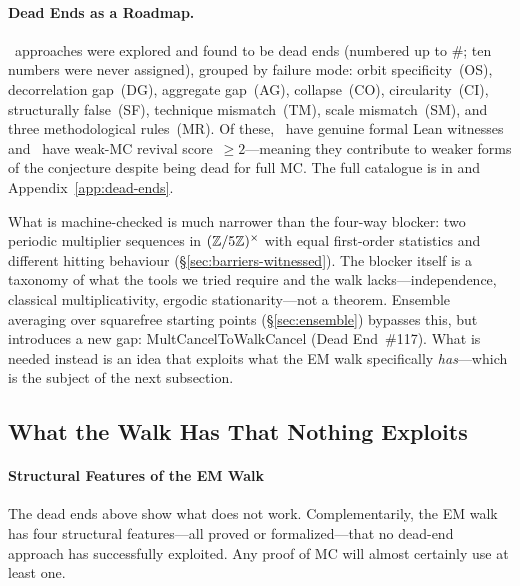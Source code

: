 \paragraph{Dead Ends as a Roadmap.}
\DEentries~approaches were explored and found to be dead ends
(numbered up to \#\DEnumbers; ten numbers were never assigned), grouped
by failure mode: orbit specificity~(OS), decorrelation gap~(DG),
aggregate gap~(AG), collapse~(CO), circularity~(CI), structurally
false~(SF), technique mismatch~(TM), scale mismatch~(SM), and three
methodological rules~(MR).  Of these, \DEwitnessed~have genuine formal
Lean witnesses and \DErevivable~have weak-MC revival score~$\geq
2$---meaning they contribute to weaker forms of the conjecture despite
being dead for full MC\@.
The full catalogue is in  and
Appendix~\ref{app:dead-ends}.



\smallskip\noindent
What is machine-checked is much narrower than the four-way blocker: two
periodic multiplier sequences in $(\mathbb{Z}/5\mathbb{Z})^\times$ with equal
first-order statistics and different hitting behaviour
(\S\ref{sec:barriers-witnessed}).  The blocker itself is a taxonomy of
what the tools we tried require and the walk lacks---independence,
classical multiplicativity, ergodic stationarity---not a theorem.  Ensemble averaging over squarefree starting points
(\S\ref{sec:ensemble}) bypasses this, but introduces a new gap:
MultCancelToWalkCancel (Dead End~\#117).  What is needed instead is an idea
that exploits what the EM walk specifically \emph{has}---which is the
subject of the next subsection.

\subsection{What the Walk Has That Nothing Exploits}
\label{sec:walk-features}

\paragraph{Structural Features of the EM Walk}

The dead ends above show what does not work.  Complementarily, the EM
walk has four structural features---all proved or formalized---that no
dead-end approach has successfully exploited.  Any proof of MC will
almost certainly use at least one.

